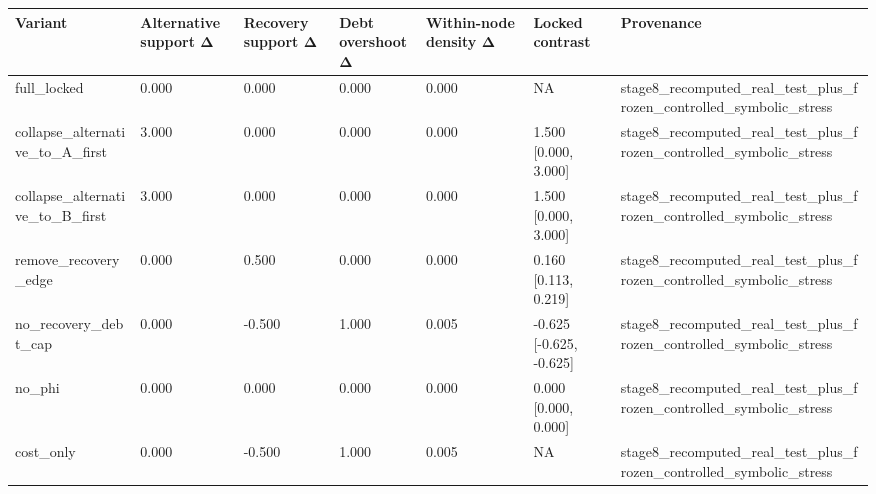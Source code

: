 \begin{tabular}{lllllll}
\toprule
Variant & Alternative support Δ & Recovery support Δ & Debt overshoot Δ & Within-node density Δ & Locked contrast & Provenance \\
\midrule
full\_locked & 0.000 & 0.000 & 0.000 & 0.000 & NA & stage8\_recomputed\_real\_test\_plus\_frozen\_controlled\_symbolic\_stress \\
collapse\_alternative\_to\_A\_first & 3.000 & 0.000 & 0.000 & 0.000 & 1.500 [0.000, 3.000] & stage8\_recomputed\_real\_test\_plus\_frozen\_controlled\_symbolic\_stress \\
collapse\_alternative\_to\_B\_first & 3.000 & 0.000 & 0.000 & 0.000 & 1.500 [0.000, 3.000] & stage8\_recomputed\_real\_test\_plus\_frozen\_controlled\_symbolic\_stress \\
remove\_recovery\_edge & 0.000 & 0.500 & 0.000 & 0.000 & 0.160 [0.113, 0.219] & stage8\_recomputed\_real\_test\_plus\_frozen\_controlled\_symbolic\_stress \\
no\_recovery\_debt\_cap & 0.000 & -0.500 & 1.000 & 0.005 & -0.625 [-0.625, -0.625] & stage8\_recomputed\_real\_test\_plus\_frozen\_controlled\_symbolic\_stress \\
no\_phi & 0.000 & 0.000 & 0.000 & 0.000 & 0.000 [0.000, 0.000] & stage8\_recomputed\_real\_test\_plus\_frozen\_controlled\_symbolic\_stress \\
cost\_only & 0.000 & -0.500 & 1.000 & 0.005 & NA & stage8\_recomputed\_real\_test\_plus\_frozen\_controlled\_symbolic\_stress \\
\bottomrule
\end{tabular}

